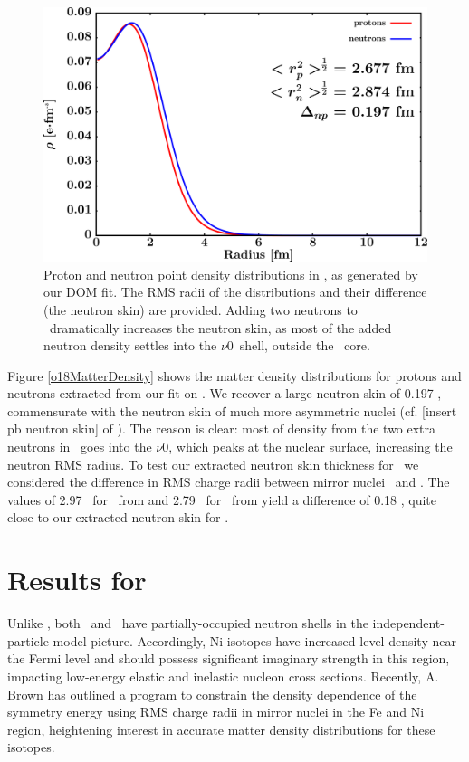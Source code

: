 \begin{figure}[tb]
    \centering
    \includegraphics[width=\textwidth]{figures/o18_matterDensity.png}
    \caption[Proton and neutron matter density distributions in \oEight]
    {
        Proton and neutron point density distributions in \oEight, as
        generated by our DOM fit. The RMS radii of the distributions and their
        difference (the neutron skin) are provided. Adding two neutrons to \oSix\ dramatically
        increases the neutron skin, as most of the added neutron density settles into
        the $\nu$0\dFive\ shell, outside the \oSix\ core.
    }
    \label{o18MatterDistribution}
\end{figure}

Figure \ref{o18MatterDensity} shows the matter density distributions for protons
and neutrons extracted from our fit on \oEight. We recover a large neutron skin of
0.197 \femto\meter, commensurate with the neutron skin of much more asymmetric
nuclei (cf. [insert pb neutron skin] of \pbEight). The reason is clear: most
of density from the two extra neutrons in \oEight\ goes into the
$\nu$0\dFive, which peaks at the nuclear surface, increasing the neutron RMS
radius. To test our extracted neutron skin thickness for \oEight\, we considered 
the difference in RMS charge radii between mirror nuclei \neEight\ and \oEight.
The values of 2.97 \femto\meter\ for \neEight\ from \cite{Marinova2011} and
2.79 \femto\meter\ for \oEight\ from \cite{DeVries} yield a difference of 0.18
\femto\meter, quite close to our extracted neutron skin for \oEight.

\section{Results for \niEightFour}
Unlike \caAughtEight, both \niEight\ and \niFour\ have partially-occupied neutron shells in the
independent-particle-model picture. Accordingly, Ni isotopes have increased level density near the
Fermi level and should possess significant imaginary strength in this region, impacting
low-energy elastic and inelastic nucleon cross sections. Recently, A. Brown has outlined a
program to constrain the density dependence of the symmetry energy using RMS charge radii in mirror
nuclei in the Fe and Ni region, heightening interest in accurate
matter density distributions for these isotopes.

